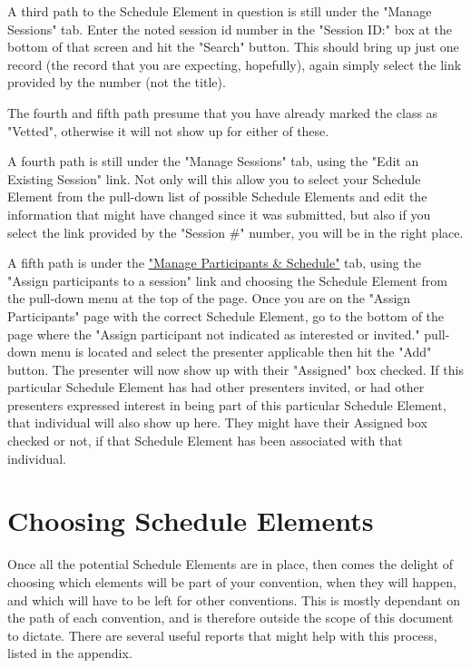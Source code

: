 \documentclass[captions=tablesignature]{scrartcl}
\begin{document}
A third path to the Schedule Element in question is still under the
"Manage Sessions" tab. Enter the noted session id number in the
"Session ID:" box at the bottom of that screen and hit the "Search"
button.  This should bring up just one record (the record that you
are expecting, hopefully), again simply select the link provided by
the number (not the title).

The fourth and fifth path presume that you have already marked the
class as "Vetted", otherwise it will not show up for either of
these.

A fourth path is still under the "Manage Sessions" tab, using the
"Edit an Existing Session" link.  Not only will this allow you to
select your Schedule Element from the pull-down list of possible
Schedule Elements and edit the information that might have changed
since it was submitted, but also if you select the link provided by
the "Session \#" number, you will be in the right place.

A fifth path is under the \hyperref[sec-2]{"Manage Participants \& Schedule"} tab,
using the "Assign participants to a session" link and choosing the
Schedule Element from the pull-down menu at the top of the page.
Once you are on the "Assign Participants" page with the correct
Schedule Element, go to the bottom of the page where the "Assign
participant not indicated as interested or invited." pull-down menu
is located and select the presenter applicable then hit the "Add"
button.  The presenter will now show up with their "Assigned" box
checked.  If this particular Schedule Element has had other
presenters invited, or had other presenters expressed interest in
being part of this particular Schedule Element, that individual
will also show up here.  They might have their Assigned box checked
or not, if that Schedule Element has been associated with that
individual.
\section{Choosing Schedule Elements}
\label{sec-6}

Once all the potential Schedule Elements are in place, then comes
the delight of choosing which elements will be part of your
convention, when they will happen, and which will have to be
left for other conventions.  This is mostly dependant on the path of
each convention, and is therefore outside the scope of this document
to dictate.  There are several useful reports that might help with
this process, listed in the appendix.
\end{document}
